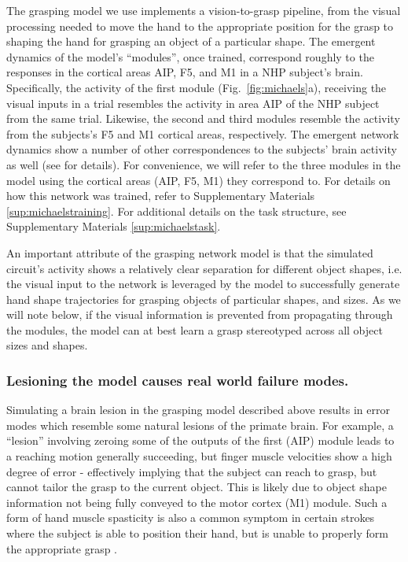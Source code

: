 \documentclass[12pt]{iopart}
\begin{document}
The grasping model we use \cite{michaels.mrnn} implements a vision-to-grasp pipeline, from the visual
processing needed to move the hand to the appropriate position for the grasp to shaping the hand for
grasping an object of a particular shape. The emergent dynamics of the model's ``modules'', once trained,
correspond roughly to the responses in the cortical areas AIP, F5, and M1 in a NHP subject's brain.
Specifically, the activity of the first module (Fig.~\ref{fig:michaels}a), receiving the visual inputs in a trial resembles
the activity in area AIP of the NHP subject from the same trial. Likewise, the second and
third modules resemble the activity from the subjects's F5 and M1 cortical areas, respectively.
The emergent network dynamics show a number of other correspondences to the subjects' 
brain activity as well (see \cite{michaels.mrnn} for details). For convenience, we will refer to the three
modules in the model using the cortical areas (AIP, F5, M1) they correspond to. For details on how this network
was trained, refer to Supplementary Materials \ref{sup:michaelstraining}. For additional details on the task structure, see
Supplementary Materials \ref{sup:michaelstask}.

An important attribute of the grasping network model is that  the simulated circuit's activity shows a relatively
clear separation for different object shapes, i.e. the visual input to the network is leveraged by the model to
successfully generate hand shape trajectories for grasping objects of particular shapes, and sizes. As we will note
below, if the visual information is prevented from propagating through the modules, the model can at best learn a
grasp stereotyped across all object sizes and shapes. 

\subsubsection{Lesioning the model causes real world failure modes.}
Simulating a brain lesion in the grasping model described above results in error
modes which resemble some natural lesions of the primate brain. For example, a ``lesion''
involving zeroing some of the outputs of the first (AIP) module 
leads to a reaching motion generally succeeding, but finger muscle velocities show a high
degree of error - effectively implying that the subject can reach to grasp, but cannot
tailor the grasp to the current object. This is likely due to object shape information not
being fully conveyed to the motor cortex (M1) module. Such a form of hand muscle spasticity
is also a common symptom in certain strokes where the subject is able to position their
hand, but is unable to properly form the appropriate grasp \cite{khanna.openloop,
puthenveettil.hand}. 
\end{document}
